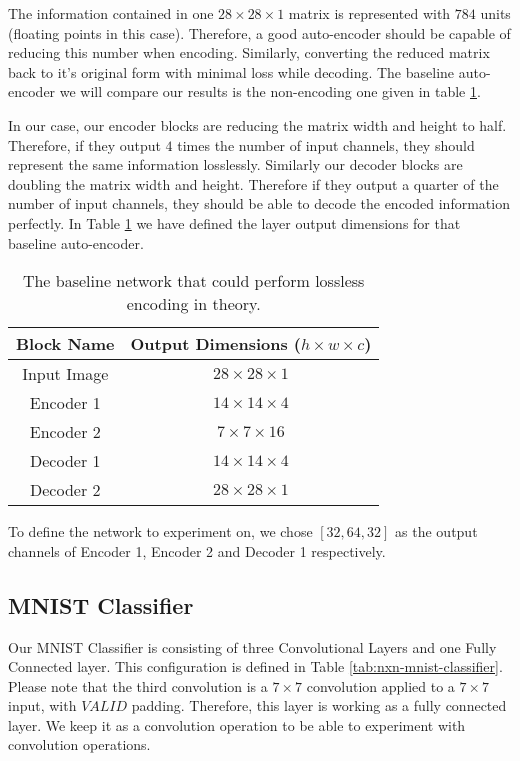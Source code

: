 The information contained in one $28 \times 28 \times 1$ matrix is represented with $784$ units (floating points in this case). Therefore, a good auto-encoder should be capable of reducing this number when encoding. Similarly, converting the reduced matrix back to it's original form with minimal loss while decoding. The baseline auto-encoder we will compare our results is the non-encoding one given in table \ref{tab:mnist_baseline_encoder}.

In our case, our encoder blocks are reducing the matrix width and height to half. Therefore, if they output $4$ times the number of input channels, they should represent the same information losslessly. Similarly our decoder blocks are doubling the matrix width and height. Therefore if they output a quarter of the number of input channels, they should be able to decode the encoded information perfectly. In Table \ref{tab:mnist_baseline_encoder} we have defined the layer output dimensions for that baseline auto-encoder.
\begin{table}
\begin{center}
\begin{tabular}{ c | c }
 Block Name & Output Dimensions ($h \times w \times c$) \\
 \hline
 Input Image & $28 \times 28 \times 1$ \\
 Encoder 1 & $14 \times 14 \times 4$ \\  
 Encoder 2 & $7 \times 7 \times 16$ \\
 Decoder 1 & $14 \times 14 \times 4$ \\  
 Decoder 2 & $28 \times 28 \times 1$ 
\end{tabular}
\end{center}
\caption{The baseline network that could perform lossless encoding in theory.}
\label{tab:mnist_baseline_encoder}
\end{table}

To define the network to experiment on, we chose $[32, 64, 32]$ as the output channels of Encoder 1, Encoder 2 and Decoder 1 respectively.


\subsection{MNIST Classifier}
Our MNIST Classifier is consisting of three Convolutional Layers and one Fully Connected layer. This configuration is defined in Table \ref{tab:nxn-mnist-classifier}. Please note that the third convolution is a $7 \times 7$ convolution applied to a $7 \times 7$ input, with $VALID$ padding. Therefore, this layer is working as a fully connected layer. We keep it as a convolution operation to be able to experiment with convolution operations.

